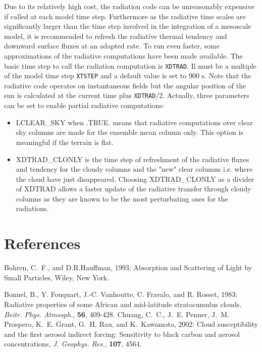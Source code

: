 Due to its relatively high cost, the radiation code can be unreasonably expensive if called at each model time step. Furthermore as the radiative time scales are significantly larger than the time step involved in the integration of a mesoscale model, it is recommended to refresh the radiative thermal tendency and downward surface fluxes at an adapted rate. To run even faster, some approximations of the radiative computations have been made available. The basic time step to call the radiation computation is {\tt XDTRAD}. Il must be a multiple of the model time step {\tt XTSTEP} and a default value is set to 900 s. Note that the radiative code operates on instantaneous fields but the angular position of the sun is calculated at the current time plus {\tt XDTRAD}/2. Actually, three parameters can be set to enable partial radiative computations:

\begin{itemize}
\item LCLEAR\_SKY when .TRUE. means that radiative computations over clear sky columns are made for the ensemble mean column only. This option is meaningful if the terrain is flat.

\item XDTRAD\_CLONLY is the time step of refreshment of the radiative fluxes and tendency for the cloudy columns and the "new" clear columns i.e. where the cloud have just disappeared. Choosing XDTRAD\_CLONLY as a divider of XDTRAD allows a faster update of the radiative transfer through cloudy columns as they are known to be the most perturbating ones for the radiations. 

\end{itemize}

\section{References}
\decrefname
Bohren, C.~F., and D.R.Hauffman, 1993: Absorption and Scattering of Light by
  Small Particles, Wiley, New York.

\decrefname
Bonnel, B., Y. Fouquart, J.-C. Vanhoutte, C. Fravalo, and R. Rosset, 1983:
      Radiative properties of some African and mid-latitude stratocumulus
      clouds.
      {\it Beitr. Phys. Atmosph.},
      {\bf 56},
      409-428.
\decrefname
Chuang, C.~C., J.~E. Penner, J.~M. Prospero, K.~E. Grant, G.~H. Rau, and
  K.~Kawamoto, 2002: Cloud susceptibility and the first aerosol indirect
  forcing: Sensitivity to black carbon and aerosol concentrations,
  {\it J. Geophys. Res.}, {\bf 107}, 4564.


